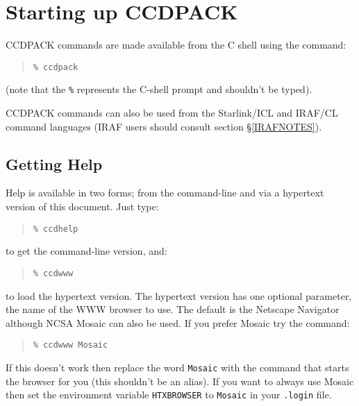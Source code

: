 \documentclass[twoside,11pt]{article}
\newcommand{\htmladdnormallink}[2]{#1}
\newcommand{\xref}[3]{#1}
\newcommand{\xlabel}[1]{}
\renewcommand{\_}{\texttt{\symbol{95}}}
\newenvironment{myquote}{\begin{quote}\begin{small}}{\end{small}\end{quote}}
\newcommand{\text}[1]{{\small \tt #1}}
\begin{document}
\section{\xlabel{startup}Starting up CCDPACK}

CCDPACK commands are made available from the C shell using the command:
\begin{myquote}
\begin{verbatim}
% ccdpack
\end{verbatim}
\end{myquote}
(note that the \text{\%} represents the C-shell prompt and shouldn't be typed).

CCDPACK commands can also be used from the Starlink/\xref{ICL}{sg5}{}
and IRAF/CL command languages (IRAF users should consult section
\S\ref{IRAFNOTES}).

\subsection{\xlabel{gettinghelp}Getting Help}

Help is available in two forms; from the command-line and via a
hypertext version of this document.
Just type:
\begin{myquote}
\begin{verbatim}
% ccdhelp
\end{verbatim}
\end{myquote}
to get the command-line version, and:
\begin{myquote}
\begin{verbatim}
% ccdwww
\end{verbatim}
\end{myquote}
to load the hypertext version. The hypertext version has one optional
parameter, the name of the WWW browser to use. The default is
\htmladdnormallink{the Netscape Navigator}{http://home.netscape.com/}
although
\htmladdnormallink{NCSA Mosaic}
{http://www.ncsa.uiuc.edu/SDG/Software/Mosaic/Docs/help-about.html}
can also be used. If you prefer Mosaic try the command:
\begin{myquote}
\begin{verbatim}
% ccdwww Mosaic
\end{verbatim}
\end{myquote}
If this doesn't work then replace the word \text{Mosaic} with the
command that starts the browser for you (this shouldn't be an alias).
If you want to always use Mosaic then set the environment variable
\text{HTX\_BROWSER} to \text{Mosaic} in your \text{.login} file.
\end{document}
